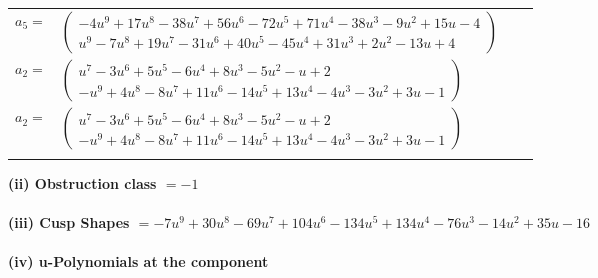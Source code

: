 \documentclass[1p]{elsarticle_modified}
\theoremstyle{definition}
\begin{document}
\begin{tabular}{m{7pt} m{180pt} m{7pt} m{180pt} }
\flushright $a_{5}=$&$\begin{pmatrix}-4 u^9+17 u^8-38 u^7+56 u^6-72 u^5+71 u^4-38 u^3-9 u^2+15 u-4\\u^9-7 u^8+19 u^7-31 u^6+40 u^5-45 u^4+31 u^3+2 u^2-13 u+4\end{pmatrix}$ \\
\flushright $a_{2}=$&$\begin{pmatrix}u^7-3 u^6+5 u^5-6 u^4+8 u^3-5 u^2- u+2\\- u^9+4 u^8-8 u^7+11 u^6-14 u^5+13 u^4-4 u^3-3 u^2+3 u-1\end{pmatrix}$\\ \flushright $a_{2}=$&$\begin{pmatrix}u^7-3 u^6+5 u^5-6 u^4+8 u^3-5 u^2- u+2\\- u^9+4 u^8-8 u^7+11 u^6-14 u^5+13 u^4-4 u^3-3 u^2+3 u-1\end{pmatrix}$\\&\end{tabular}
\flushleft \textbf{(ii) Obstruction class $= -1$}\\~\\
\flushleft \textbf{(iii) Cusp Shapes $= -7 u^9+30 u^8-69 u^7+104 u^6-134 u^5+134 u^4-76 u^3-14 u^2+35 u-16$}\\~\\
\newpage\renewcommand{\arraystretch}{1}
\flushleft \textbf{(iv) u-Polynomials at the component}\newline \\
\end{document}
